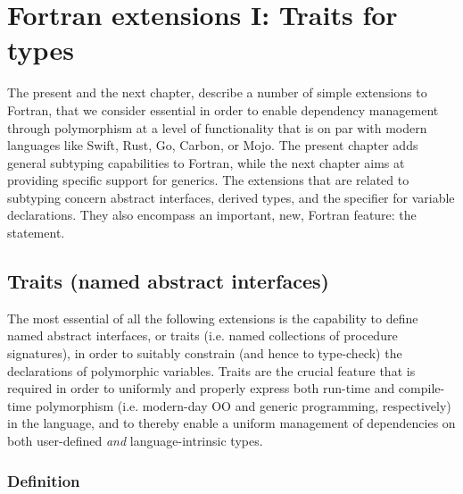 \documentclass[11pt,oneside]{report}
\newcommand{\code}[1]{{\selectfont\ttfamily{#1}}}
\begin{document}
\chapter{Fortran extensions I: Traits for types}
\label{chapt:traits}

The present and the next chapter, describe a number of simple
extensions to Fortran, that we consider essential in order to enable
dependency management through polymorphism at a level of functionality
that is on par with modern languages like Swift, Rust, Go, Carbon, or
Mojo. The present chapter adds general subtyping capabilities to
Fortran, while the next chapter aims at providing specific support for
generics. The extensions that are related to subtyping concern
abstract interfaces, derived types, and the \code{class} specifier for
variable declarations. They also encompass an important, new, Fortran
feature: the \code{implements} statement.

\section{Traits (named abstract interfaces) }
\label{sect:traits}

The most essential of all the following extensions is the capability
to define named abstract interfaces, or traits (i.e. named collections
of procedure signatures), in order to suitably constrain (and hence to
type-check) the declarations of polymorphic variables. Traits are the
crucial feature that is required in order to uniformly and properly
express both run-time and compile-time polymorphism (i.e. modern-day
OO and generic programming, respectively) in the language, and to
thereby enable a uniform management of dependencies on both
user-defined \emph{and} language-intrinsic types.

\subsection{Definition}
\label{sect:interface_defs}
\end{document}
